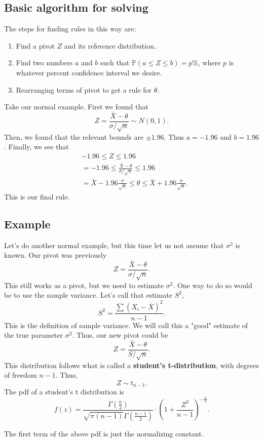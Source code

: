 \documentclass[titlepage, 12pt, leqno]{article}
\begin{document}
\subsection{Basic algorithm for solving}
The steps for finding rules in this way are:
\begin{enumerate}
    \item Find a pivot $Z$ and its reference distribution.
    \item Find two numbers $a$ and $b$ such that $\mathbb{P}(a \le Z \le b)
        = p\%$, where $p$ is whatever percent confidence interval we desire.
    \item Rearranging terms of pivot to get a rule for $\theta$.
\end{enumerate}
Take our normal example. First we found that
\[
Z = \frac{\bar X - \theta}{\sigma/ \sqrt{n}} \sim N(0,1).
\]
Then, we found that the relevant bounds are $ \pm 1.96$. Thus $a =-1.96$ and
$b=1.96$. Finally, we see that 
\begin{align*}
    &-1.96 \le Z \le 1.96  \\
    &= -1.96 \le \frac{\bar X - \theta}{\sigma/\sqrt{n}} \le 1.96\\
    &= \bar X - 1.96 \frac{\sigma}{\sqrt{n}} \le \theta \le
    \bar X + 1.96 \frac{\sigma}{\sqrt{n}}.
\end{align*}
This is our final rule.

\subsection{Example}
Let's do another normal example, but this time let us not assume that 
$\sigma^{2}$ is known. Our pivot was previously
\[
Z = \frac{\bar X - \theta}{\sigma/\sqrt{n}}.
\]
This still works as a pivot, but we need to estimate $\sigma^{2}$. One way to
do so would be to use the sample variance. Let's call that estimate $S^{2}$, 
\[
S^{2} = \frac{\sum (X_{i} - \bar X)^{2}}{n-1}.
\]
This is the definition of sample variance. We will call this a "good" estimate
of the true parameter $\sigma^{2}$. Thus, our new pivot could be
\[
Z = \frac{\bar X - \theta}{S/\sqrt{n}}.
\]
This distribution follows what is called a \textbf{student's t-distribution},
with degrees of freedom $n-1$. Thus,
\[
    Z \sim t_{n-1}.
\]
The pdf of a student's t distribution is
\[
f(z) = \frac{\Gamma\left(\frac{n}{2}\right)}{\sqrt{\pi(n-1)}
\Gamma\left(\frac{n-1}{2}\right)} \cdot \left(1 + \frac{Z^{2}}{n-1}\right)^{
-\frac{n}{2}}.
\]
\begin{note}
    The first term of the above pdf is just the normalizing constant.
\end{note}
\end{document}
